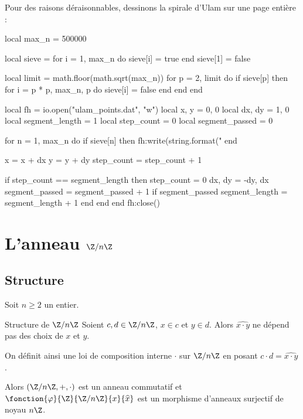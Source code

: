 \newpage
Pour des raisons déraisonnables, dessinons la spirale d'Ulam sur une page entière :
\begin{center}
\begin{luacode*}
local max_n = 500000

local sieve = {}
for i = 1, max_n do sieve[i] = true end
sieve[1] = false

local limit = math.floor(math.sqrt(max_n))
for p = 2, limit do
    if sieve[p] then
        for i = p * p, max_n, p do
            sieve[i] = false
        end
    end
end

local fh = io.open("ulam_points.dat", "w")
local x, y = 0, 0
local dx, dy = 1, 0
local segment_length = 1
local step_count = 0
local segment_passed = 0

for n = 1, max_n do
    if sieve[n] then
        fh:write(string.format("%
    end
    
    x = x + dx
    y = y + dy
    step_count = step_count + 1
    
    if step_count == segment_length then
        step_count = 0
        dx, dy = -dy, dx
        segment_passed = segment_passed + 1
        if segment_passed %
            segment_length = segment_length + 1
        end
    end
end
fh:close()
\end{luacode*}

\end{center}

\newpage 
\section{L'anneau \texorpdfstring{$\Z / n \Z$}{Z/nZ}}
\subsection{Structure}

Soit $n \geqslant 2$ un entier.

\begin{theoreme}{Structure de $\Z/n\Z$}{}
    Soient $c, d \in \Z/ n \Z$, $x \in c $ et $y \in d$. Alors 
    $\widehat{x \cdot y}$ ne dépend pas des choix de $x$ et $y$.

    On définit ainsi une loi de composition interne $\cdot$ sur $\Z / n \Z$  en posant $c \cdot d = \widehat{x \cdot y}$.

    Alors $(\Z / n \Z, +, \cdot)$ est un anneau commutatif et $\fonction{\varphi}{\Z}{\Z / n \Z}{x}{\widehat x}$ est un morphisme d'anneaux
    surjectif de noyau $n \Z$.
\end{theoreme}

